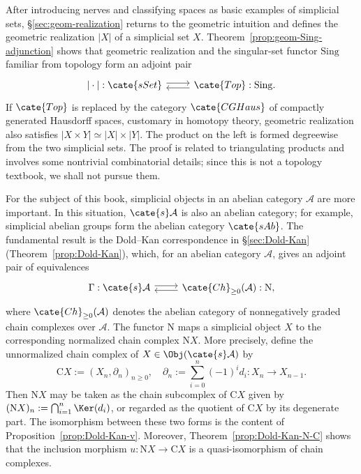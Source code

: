 After introducing nerves and classifying spaces as basic examples of
simplicial sets, \S\ref{sec:geom-realization} returns to the geometric
intuition and defines the geometric realization $|X|$ of a simplicial set
$X$. Theorem~\ref{prop:geom-Sing-adjunction} shows that geometric realization
and the singular-set functor $\mathrm{Sing}$ familiar from topology form an
adjoint pair
\[\begin{tikzcd}
	{|\cdot|}: \cate{sSet} \arrow[shift left, r] & \cate{Top} : \mathrm{Sing}. \arrow[shift left, l]
\end{tikzcd}\]
If $\cate{Top}$ is replaced by the category $\cate{CGHaus}$ of compactly
generated Hausdorff spaces, customary in homotopy theory, geometric
realization also satisfies $|X\times Y|\simeq|X|\times|Y|$. The product on
the left is formed degreewise from the two simplicial sets. The proof is
related to triangulating products and involves some nontrivial combinatorial
details; since this is not a topology textbook, we shall not pursue them.

For the subject of this book, simplicial objects in an abelian category
$\mathcal{A}$ are more important. In this situation,
$\cate{s}\mathcal{A}$ is also an abelian category; for example, simplicial
abelian groups form the abelian category $\cate{sAb}$. The fundamental result
is the Dold--Kan correspondence in \S\ref{sec:Dold-Kan}
(Theorem~\ref{prop:Dold-Kan}), which, for an abelian category $\mathcal{A}$,
gives an adjoint pair of equivalences
\[\begin{tikzcd}
	\Gamma: \cate{s}\mathcal{A} \arrow[shift left, r] & \cate{Ch}_{\geq 0}(\mathcal{A}): \mathrm{N}, \arrow[shift left, l]
\end{tikzcd}\]
where $\cate{Ch}_{\geq0}(\mathcal{A})$ denotes the abelian category of
nonnegatively graded chain complexes over $\mathcal{A}$. The functor
$\mathrm{N}$ maps a simplicial object $X$ to the corresponding normalized
chain complex $\mathrm{N}X$. More precisely, define the unnormalized chain
complex of $X\in\Obj(\cate{s}\mathcal{A})$ by
\[ \mathrm{C}X := \left( X_n, \partial_n\right)_{n \geq 0}, \quad \partial_n := \sum_{i=0}^n (-1)^i d_i : X_n \to X_{n-1}. \]
Then $\mathrm{N}X$ may be taken as the chain subcomplex of $\mathrm{C}X$
given by $(\mathrm{N}X)_n:=\bigcap_{i=1}^n\Ker(d_i)$, or regarded as the
quotient of $\mathrm{C}X$ by its degenerate part. The isomorphism between
these two forms is the content of Proposition~\ref{prop:Dold-Kan-v}.
Moreover, Theorem~\ref{prop:Dold-Kan-N-C} shows that the inclusion morphism
$u:\mathrm{N}X\to\mathrm{C}X$ is a quasi-isomorphism of chain complexes.

